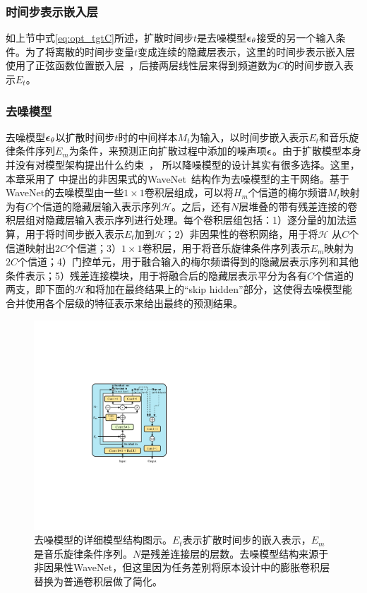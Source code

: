 \subsubsection{时间步表示嵌入层}
如上节中式\eqref{eq:opt_tgtC}所述，扩散时间步$t$是去噪模型${\boldsymbol{\epsilon}}_\theta$接受的另一个输入条件。为了将离散的时间步变量$t$变成连续的隐藏层表示，这里的时间步表示嵌入层使用了正弦函数位置嵌入层~\citep{vaswani2017attention}，后接两层线性层来得到频道数为$C$的时间步嵌入表示$E_t$。
\subsubsection{去噪模型}
去噪模型${\boldsymbol{\epsilon}}_\theta$以扩散时间步$t$时的中间样本$M_t$为输入，以时间步嵌入表示$E_t$和音乐旋律条件序列$E_m$为条件，来预测正向扩散过程中添加的噪声项${\boldsymbol{\epsilon}}$。由于扩散模型本身并没有对模型架构提出什么约束~\citep{sohl2015deep,kong2021diffwave}， 所以降噪模型的设计其实有很多选择。这里，
本章采用了\citet{rethage2018wavenet,kong2021diffwave}
中提出的非因果式的WaveNet~\citep{vanwavenet}结构作为去噪模型的主干网络。基于WaveNet的去噪模型由一些$1\times1$卷积层组成，可以将$H_m$个信道的梅尔频谱$M_t$映射为有$C$个信道的隐藏层输入表示序列$\mathcal{H}$。之后，还有$N$层堆叠的带有残差连接的卷积层组对隐藏层输入表示序列进行处理。每个卷积层组包括：1）逐分量的加法运算，用于将时间步嵌入表示$E_t$加到$\mathcal{H}$；2）非因果性的卷积网络，用于将$\mathcal{H}$ 从$C$个信道映射出$2C$个信道；3）$1\times1$卷积层，用于将音乐旋律条件序列表示$E_m$映射为$2C$个信道；4）门控单元，用于融合输入的梅尔频谱得到的隐藏层表示序列和其他条件表示；5）残差连接模块，用于将融合后的隐藏层表示平分为各有$C$个信道的两支，即下面的$\mathcal{H}$和将加在最终结果上的``skip hidden''部分，这使得去噪模型能合并使用各个层级的特征表示来给出最终的预测结果。
\begin{figure}[htbp]
	\centering
	\small
	\includegraphics[width=0.99\textwidth,]{figure/svs/denoiser.pdf}
	\caption{去噪模型的详细模型结构图示。$E_t$表示扩散时间步的嵌入表示，$E_m$是音乐旋律条件序列。$N$是残差连接层的层数。去噪模型结构来源于非因果性WaveNet\citep{vanwavenet}，但这里因为任务差别将原本设计中的膨胀卷积层替换为普通卷积层做了简化。}
	\label{supfig:denoiser}
\end{figure}
